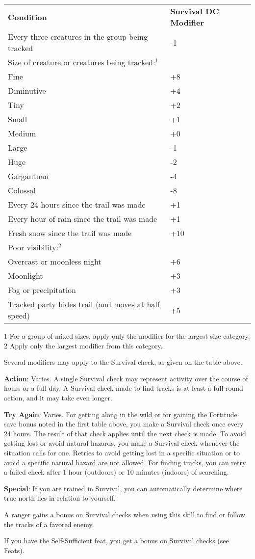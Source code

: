 \begin{table}
 \sffamily
 \begin{tabular}{ll}
\textbf{Condition} & \textbf{Survival DC Modifier}\\
Every three creatures in the group being tracked & -1\\
Size of creature or creatures being tracked:\(^{1}\) \\
Fine & +8\\
Diminutive & +4\\
Tiny & +2\\
Small & +1\\
Medium & +0\\
Large & -1\\
Huge & -2\\
Gargantuan & -4\\
Colossal & -8\\
Every 24 hours since the trail was made & +1\\
Every hour of rain since the trail was made & +1\\
Fresh snow since the trail was made & +10\\
Poor visibility:\(^{2}\) & \\
Overcast or moonless night & +6\\
Moonlight & +3\\
Fog or precipitation & +3\\
Tracked party hides trail (and moves at half speed) & +5\\
 \end{tabular}

\end{table}

1 For a group of mixed sizes, apply only the modifier for the largest size category.
2 Apply only the largest modifier from this category.

				
Several modifiers may apply to the Survival check, as given on the table above.
				
\textbf{Action}: Varies. A single Survival check may represent activity over the course of hours or a full day. A Survival check made to find tracks is at least a full-round action, and it may take even longer.
				
\textbf{Try Again}: Varies. For getting along in the wild or for gaining the Fortitude save bonus noted in the first table above, you make a Survival check once every 24 hours. The result of that check applies until the next check is made. To avoid getting lost or avoid natural hazards, you make a Survival check whenever the situation calls for one. Retries to avoid getting lost in a specific situation or to avoid a specific natural hazard are not allowed. For finding tracks, you can retry a failed check after 1 hour (outdoors) or 10 minutes (indoors) of searching.
				
\textbf{Special}: If you are trained in Survival, you can automatically determine where true north lies in relation to yourself.
				
A ranger gains a bonus on Survival checks when using this skill to find or follow the tracks of a favored enemy.
				
If you have the Self-Sufficient feat, you get a bonus on Survival checks (see Feats).
